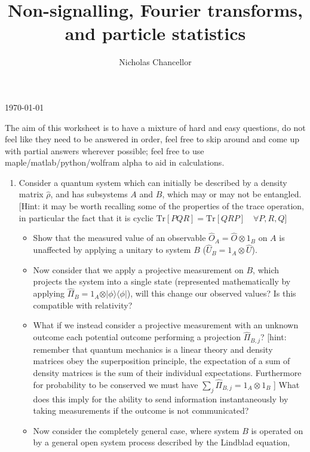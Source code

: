 \documentclass[english]{article}
\newcommand{\ketbra}[2]{\vert #1 \rangle \! \langle #2 \vert}
\begin{document}
\title{Non-signalling, Fourier transforms, and particle statistics}
\author{Nicholas Chancellor}


\maketitle


\today %


{\small The aim of this worksheet is to have a mixture of hard and easy questions, do not feel like they need to be answered in order, feel free to skip around and come up with partial answers wherever possible; feel free to use maple/matlab/python/wolfram alpha to aid in calculations.}

\begin{enumerate}
\item Consider a quantum system which can initially be described by a density matrix $\hat{\rho}$, and has subsystems $A$ and $B$, which may or may not be entangled. [Hint: it may be worth recalling some of the properties of the trace operation, in particular the fact that it is cyclic $\mathrm{Tr}[PQR]=\mathrm{Tr}[QRP]\quad \forall P,R,Q$]
\begin{itemize}
\item Show that the measured value of an observable $\hat{O}_A=\hat{O}\otimes 1_B$ on $A$ is unaffected by applying a unitary to system $B$ ($\hat{U}_B=1_A\otimes \hat{U}$).
\item Now consider that we apply a projective measurement on $B$, which projects the system into a single state (represented mathematically by applying $\hat{\Pi}_B=1_A \otimes \ketbra{\phi}{\phi}$), will this change our observed values? Is this compatible with relativity?
\item What if we instead consider a projective measurement with an unknown outcome each potential outcome performing a projection $\hat{\Pi}_{B,j}$? [hint: remember that quantum mechanics is a linear theory and density matrices obey the superposition principle, the expectation of a sum of density matrices is the sum of their individual expectations. Furthermore for probability to be conserved we must have $\sum_j \hat{\Pi}_{B,j}=1_{A}\otimes 1_{B}$ ] What does this imply for the ability to send information instantaneously by taking measurements if the outcome is not communicated?
\item Now consider the completely general case, where system $B$ is operated on by a general open system process described by the Lindblad equation,

\end{itemize}
\end{enumerate}
\end{document}
